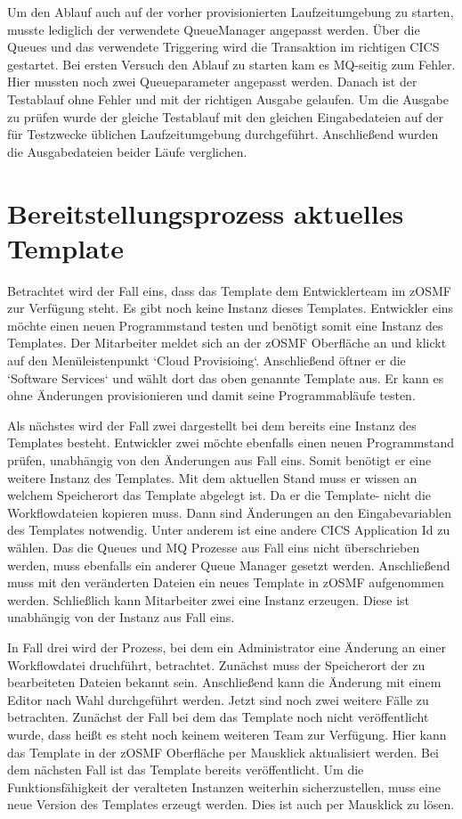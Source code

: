 Um den Ablauf auch auf der vorher provisionierten Laufzeitumgebung zu starten, musste lediglich der verwendete QueueManager angepasst werden.
Über die Queues und das verwendete Triggering wird die Transaktion im richtigen CICS gestartet.
Bei ersten Versuch den Ablauf zu starten kam es MQ-seitig zum Fehler.
Hier mussten noch zwei Queueparameter angepasst werden.
Danach ist der Testablauf ohne Fehler und mit der richtigen Ausgabe gelaufen.
Um die Ausgabe zu prüfen wurde der gleiche Testablauf mit den gleichen Eingabedateien auf der für Testzwecke üblichen Laufzeitumgebung durchgeführt.
Anschließend wurden die Ausgabedateien beider Läufe verglichen.

\section{Bereitstellungsprozess aktuelles Template}
Betrachtet wird der Fall eins, dass das Template dem Entwicklerteam im zOSMF zur Verfügung steht.
Es gibt noch keine Instanz dieses Templates.
Entwickler eins möchte einen neuen Programmstand testen und benötigt somit eine Instanz des Templates.
Der Mitarbeiter meldet sich an der zOSMF Oberfläche an und klickt auf den Menüleistenpunkt `Cloud Provisioing`.
Anschließend öftner er die `Software Services` und wählt dort das oben genannte Template aus.
Er kann es ohne Änderungen provisionieren und damit seine Programmabläufe testen.

Als nächstes wird der Fall zwei dargestellt bei dem bereits eine Instanz des Templates besteht.
Entwickler zwei möchte ebenfalls einen neuen Programmstand prüfen, unabhängig von den Änderungen aus Fall eins.
Somit benötigt er eine weitere Instanz des Templates.
Mit dem aktuellen Stand muss er wissen an welchem Speicherort das Template abgelegt ist.
Da er die Template- nicht die Workflowdateien kopieren muss.
Dann sind Änderungen an den Eingabevariablen des Templates notwendig.
Unter anderem ist eine andere CICS Application Id zu wählen.
Das die Queues und MQ Prozesse aus Fall eins nicht überschrieben werden, muss ebenfalls ein anderer Queue Manager gesetzt werden.
Anschließend muss mit den veränderten Dateien ein neues Template in zOSMF aufgenommen werden.
Schließlich kann Mitarbeiter zwei eine Instanz erzeugen.
Diese ist unabhängig von der Instanz aus Fall eins.

In Fall drei wird der Prozess, bei dem ein Administrator eine Änderung an einer Workflowdatei druchführt, betrachtet.
Zunächst muss der Speicherort der zu bearbeiteten Dateien bekannt sein.
Anschließend kann die Änderung mit einem Editor nach Wahl durchgeführt werden.
Jetzt sind noch zwei weitere Fälle zu betrachten.
Zunächst der Fall bei dem das Template noch nicht veröffentlicht wurde, dass heißt es steht noch keinem weiteren Team zur Verfügung.
Hier kann das Template in der zOSMF Oberfläche per Mausklick aktualisiert werden.
Bei dem nächsten Fall ist das Template bereits veröffentlicht.
Um die Funktionsfähigkeit der veralteten Instanzen weiterhin sicherzustellen, muss eine neue Version des Templates erzeugt werden.
Dies ist auch per Mausklick zu lösen.

